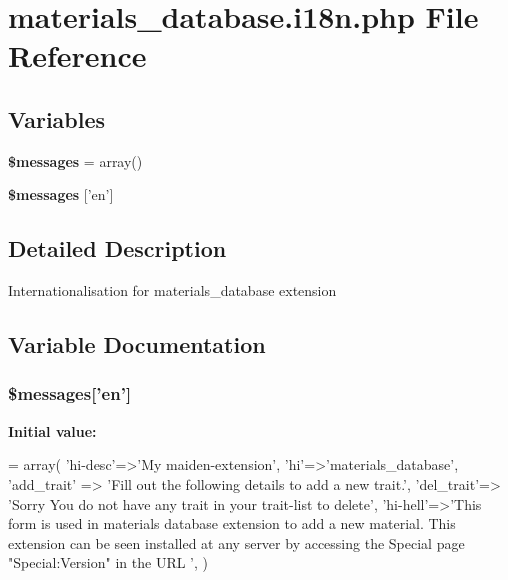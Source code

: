 \hypertarget{materials__database_8i18n_8php}{\section{materials\+\_\+database.\+i18n.\+php File Reference}
\label{materials__database_8i18n_8php}
}
\subsection*{Variables}
\begin{DoxyCompactItemize}
\item 
\hypertarget{materials__database_8i18n_8php_a21a183f927a6d243fe6b4ba3a6c4d4c8}{{\bfseries \$messages} = array()}\label{materials__database_8i18n_8php_a21a183f927a6d243fe6b4ba3a6c4d4c8}

\item 
{\bfseries \$messages} \mbox{[}'en'\mbox{]}
\end{DoxyCompactItemize}


\subsection{Detailed Description}
Internationalisation for materials\+\_\+database extension 

\subsection{Variable Documentation}
\hypertarget{materials__database_8i18n_8php_af162e1ff2d89585b3c3102d4447d67ca}{
\subsubsection[{\$messages}]{\setlength{\rightskip}{0pt plus 5cm}\$messages\mbox{[}'en'\mbox{]}}}\label{materials__database_8i18n_8php_af162e1ff2d89585b3c3102d4447d67ca}
{\bfseries Initial value\+:}
\begin{DoxyCode}
= array(
    \textcolor{stringliteral}{'hi-desc'}=>\textcolor{stringliteral}{'My maiden-extension'},
    \textcolor{stringliteral}{'hi'}=>\textcolor{stringliteral}{'materials\_database'},
    \textcolor{stringliteral}{'add\_trait'} => \textcolor{stringliteral}{'Fill out the following details to add a new trait.'},
    \textcolor{stringliteral}{'del\_trait'}=> \textcolor{stringliteral}{'Sorry You do not have any trait in your trait-list to delete'},
    \textcolor{stringliteral}{'hi-hell'}=>\textcolor{stringliteral}{'This form is used in materials database extension to add a new material. This extension can
       be seen installed at any server by accessing the Special page "Special:Version" in the URL '},
)
\end{DoxyCode}
